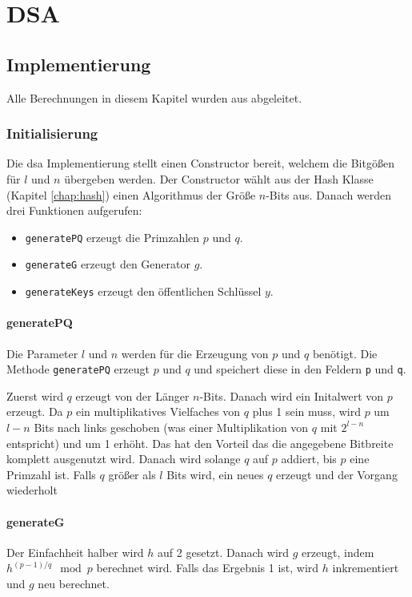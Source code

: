 \chapter{DSA}

\section{Implementierung}

Alle Berechnungen in diesem Kapitel wurden aus \cite{enwiki:1194947270} abgeleitet.

\subsection{Initialisierung}
Die \gls{dsa} Implementierung stellt einen Constructor bereit, welchem die Bitgößen für $l$ und $n$ übergeben werden. Der Constructor wählt aus der Hash Klasse (Kapitel \ref{chap:hash}) einen Algorithmus der Größe $n$-Bits aus. Danach werden drei Funktionen aufgerufen:
\begin{itemize}
    \item \texttt{generatePQ} erzeugt die Primzahlen $p$ und $q$.
    \item \texttt{generateG} erzeugt den Generator $g$.
    \item \texttt{generateKeys} erzeugt den öffentlichen Schlüssel $y$.
\end{itemize}

\subsubsection{generatePQ}
Die Parameter $l$ und $n$ werden für die Erzeugung von $p$ und $q$ benötigt. Die Methode \texttt{generatePQ} erzeugt $p$ und $q$ und speichert diese in den Feldern \texttt{p} und \texttt{q}.

Zuerst wird $q$ erzeugt von der Länger $n$-Bits. Danach wird ein Initalwert von $p$ erzeugt. Da $p$ ein multiplikatives Vielfaches von $q$ plus 1 sein muss, wird $p$ um $l-n$ Bits nach links geschoben (was einer Multiplikation von $q$ mit $2^{l-n}$ entspricht) und um 1 erhöht. Das hat den Vorteil das die angegebene Bitbreite komplett ausgenutzt wird. Danach wird solange $q$ auf $p$ addiert, bis $p$ eine Primzahl ist.
Falls $q$ größer als $l$ Bits wird, ein neues $q$ erzeugt und der Vorgang wiederholt

\subsubsection{generateG}
Der Einfachheit halber wird $h$ auf 2 gesetzt. Danach wird $g$ erzeugt, indem $h^{(p-1)/q} \mod p$ berechnet wird. Falls das Ergebnis 1 ist, wird $h$ inkrementiert und $g$ neu berechnet.

